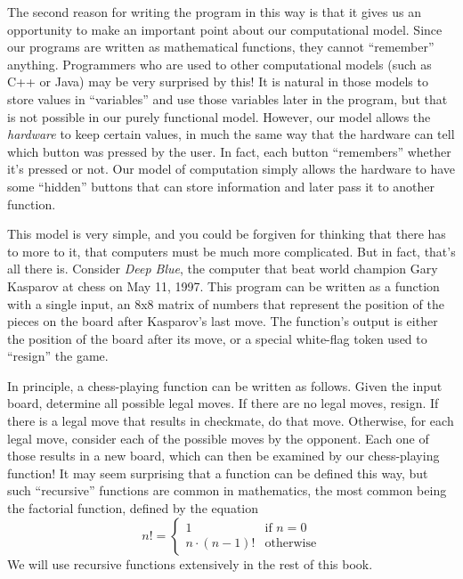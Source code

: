 The second reason for writing the program in this way is that it
gives us an opportunity to make an important point about our
computational model.  Since our programs are written as mathematical
functions, they cannot ``remember'' anything.  Programmers who are
used to other computational models (such as C++ or Java) may be
very surprised by this!  It is natural in those models to store
values in ``variables'' and use those variables later in the program,
but that is not possible in our purely functional model.  However, our
model allows the \emph{hardware} to keep certain values, in much the
same way that the hardware can tell which button was pressed by the
user.  In fact, each button ``remembers'' whether it's pressed or not.
Our model of computation simply allows the hardware to have some
``hidden'' buttons that can store information and later pass it to
another function.

This model is very simple, and you could be forgiven for thinking that
there has to more to it, that computers must be much more complicated.
But in fact, that's all there is.  Consider \textit{Deep Blue}, the
computer that beat world champion Gary Kasparov at chess on May 11,
1997.  This program can be written as a function with a single input,
an 8x8 matrix of numbers that represent the position of the pieces
on the board after Kasparov's last move.  The function's output is 
either the position of the board after its move, or a special
white-flag token used to ``resign'' the game.

In principle, a chess-playing function can be written as follows.
Given the input board, determine all possible legal moves.  If there
are no legal moves, resign.  If there is a legal move that results
in checkmate, do that move.  Otherwise, for each legal move, consider
each of the possible moves by the opponent.  Each one of those results
in a new board, which can then be examined by our chess-playing
function!  It may seem surprising that a function can be defined this
way, but such ``recursive'' functions are common in mathematics, the
most common being the factorial function, defined by the equation 
\begin{displaymath}
n! = 
\left\{
        \begin{array}{ll}
                1              & \mbox{if } n = 0 \\
                n \cdot (n-1)! & \mbox{otherwise}
        \end{array}     
\right.
\end{displaymath}       
We will use recursive functions extensively in the rest of this book.

